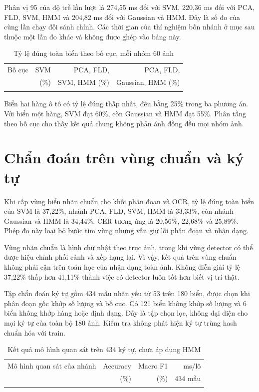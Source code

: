 Phân vị 95 của độ trễ lần lượt là 274,55 ms đối với SVM, 220,36 ms đối với PCA, FLD, SVM, HMM và 204,82 ms đối với Gaussian và HMM. Đây là số đo của cùng lần chạy đối sánh chính. Các thời gian của thí nghiệm bốn nhánh ở mục sau thuộc một lần đo khác và không được ghép vào bảng này.

\begin{table}[H]\centering
\caption{Tỷ lệ đúng toàn biển theo bố cục, mỗi nhóm 60 ảnh}\label{tab:layouts}
\begin{tabularx}{\textwidth}{Y r r r}
\toprule
Bố cục & SVM & PCA, FLD, & PCA, FLD,\\
 & (\%) & SVM, HMM (\%) & Gaussian, HMM (\%)\\
\midrule
{}
\bottomrule
\end{tabularx}
\end{table}

Biển hai hàng ô tô có tỷ lệ đúng thấp nhất, đều bằng 25\% trong ba phương án. Với biển một hàng, SVM đạt 60\%, còn Gaussian và HMM đạt 55\%. Phân tầng theo bố cục cho thấy kết quả chung không phản ánh đồng đều mọi nhóm ảnh.

\section{Chẩn đoán trên vùng chuẩn và ký tự}
Khi cấp vùng biển nhãn chuẩn cho khối phân đoạn và OCR, tỷ lệ đúng toàn biển của SVM là 37,22\%, nhánh PCA, FLD, SVM, HMM là 33,33\%, còn nhánh Gaussian và HMM là 34,44\%. CER tương ứng là 20,56\%, 22,68\% và 25,89\%. Phép đo này loại bỏ bước tìm vùng nhưng vẫn giữ lỗi phân đoạn và nhận dạng.

Vùng nhãn chuẩn là hình chữ nhật theo trục ảnh, trong khi vùng detector có thể được hiệu chỉnh phối cảnh và xếp hạng lại. Vì vậy, kết quả trên vùng chuẩn không phải cận trên toán học của nhận dạng toàn ảnh. Không diễn giải tỷ lệ 37,22\% thấp hơn 41,11\% thành việc có detector luôn tốt hơn biết vị trí thật.

Tập chẩn đoán ký tự gồm 434 mẫu nhãn yếu từ 53 trên 180 biển, được chọn khi phân đoạn gốc khớp số lượng và bố cục. Có 121 biển không khớp số lượng và 6 biển không khớp hàng hoặc định dạng. Đây là tập chọn lọc, không đại diện cho mọi ký tự của toàn bộ 180 ảnh. Kiểm tra không phát hiện ký tự trùng hash chuẩn hóa với train.

\begin{table}[H]\centering
\caption{Kết quả mô hình quan sát trên 434 ký tự, chưa áp dụng HMM}\label{tab:glyph}
\begin{tabularx}{\textwidth}{Y r r r}
\toprule
Mô hình quan sát của nhánh & Accuracy & Macro F1 & ms/lô\\
 & (\%) & (\%) & 434 mẫu\\
\midrule
{}
\bottomrule
\end{tabularx}
\end{table}

